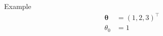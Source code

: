\documentclass[169]{beamer}
\begin{document}
  \begin{frame}[t]{Example}
    \begin{align}
      \symbf{\theta} &= (1, 2, 3)^\top \\
            \theta_0 &= 1
    \end{align}
  \end{frame}
\end{document}
